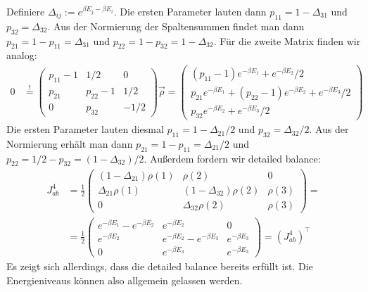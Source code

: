 \documentclass[a4paper,12pt]{article}
\begin{document}
Definiere $\Delta_{ij}:=e^{\beta E_j-\beta E_i}$. Die ersten Parameter lauten dann $p_{11}=1-\Delta_{31}$ und $p_{32}=\Delta_{32}$. Aus der Normierung der Spaltensummen findet man dann $p_{21}=1-p_{11}=\Delta_{31}$ und $p_{22}=1-p_{32}=1-\Delta_{32}$.
Für die zweite Matrix finden wir analog:
\begin{align*}
0&\overset{!}{=}\begin{pmatrix}
p_{11}-1&1/2&0 \\ p_{21}&p_{22}-1&1/2 \\ 0&p_{32}&-1/2
\end{pmatrix}\vec{\rho}=\begin{pmatrix}
(p_{11}-1)e^{-\beta E_1}+e^{-\beta E_2}/2 \\
p_{21}e^{-\beta E_1} + (p_{22}-1)e^{-\beta E_2} + e^{-\beta E_3}/2 \\
p_{32}e^{-\beta E_2}+e^{-\beta E_3}/2
\end{pmatrix}
\end{align*}
Die ersten Parameter lauten diesmal $p_{11}=1-\Delta_{21}/2$ und $p_{32}=\Delta_{32}/2$. Aus der Normierung erhält man dann $p_{21}=1-p_{11}=\Delta_{21}/2$ und $p_{22}=1/2-p_{32}=(1-\Delta_{32})/2$. Außerdem fordern wir detailed balance:
\begin{align*}
J_{ab}^4&=\frac{1}{2}\begin{pmatrix}
(1-\Delta_{21})\rho(1)&\rho(2)&0 \\ 
\Delta_{21}\rho(1)&(1-\Delta_{32})\rho(2)&\rho(3) \\ 
0&\Delta_{32}\rho(2)&\rho(3)
\end{pmatrix}=\\
&=\frac{1}{2}\begin{pmatrix}
e^{-\beta E_1} - e^{-\beta E_2}&e^{-\beta E_2}&0\\
e^{-\beta E_2}&e^{-\beta E_2}-e^{-\beta E_3}&e^{-\beta E_3}\\
0&e^{-\beta E_3}&e^{-\beta E_3}
\end{pmatrix}=(J_{ab}^4)^\top
\end{align*}
Es zeigt sich allerdings, dass die detailed balance bereits erfüllt ist. Die Energieniveaus können also allgemein gelassen werden.
\end{document}
